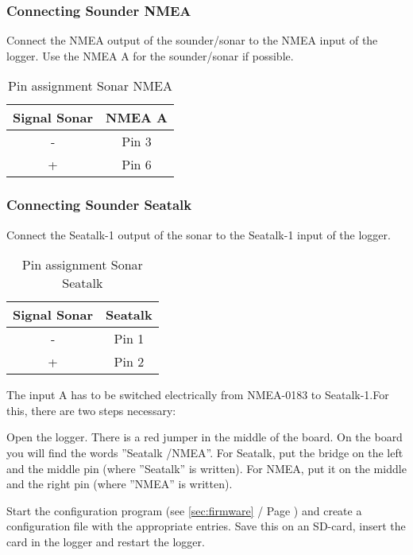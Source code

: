 \documentclass[pdftex, 8pt, paper=130mm:92mm,pagesize]{scrartcl}
\begin{document}
\subsubsection{Connecting Sounder NMEA}

Connect the NMEA output of the sounder/sonar to the NMEA input of the logger. Use the NMEA A for the sounder/sonar if possible. 

\begin{table}[H]
\centering
{}
\begin{tabular}{cc} \toprule
Signal Sonar & NMEA A\\ \midrule
- & Pin 3\\
+ & Pin 6\\ \bottomrule
\end{tabular}	
\caption{Pin assignment Sonar NMEA}
\end{table}

\subsubsection{Connecting Sounder Seatalk}\label{sec:seatalk}

Connect the Seatalk-1 output of the sonar to the Seatalk-1 input of the logger.

\begin{table}[H]
\centering
{}
\begin{tabular}{cc} \toprule
Signal Sonar & Seatalk\\ \midrule
- & Pin 1\\
+ & Pin 2\\ \bottomrule
\end{tabular}	
\caption{Pin assignment Sonar Seatalk}
\end{table}
\newpage
The input A has to be switched electrically from NMEA-0183 to Seatalk-1.\newline For this, there are two steps necessary:

\begin{compactenum}
 \item Open the logger. There is a red jumper in the middle of the board. On the board you will find the words ''Seatalk /NMEA''. For Seatalk, put the bridge on the left and the middle pin (where ''Seatalk'' is written). For NMEA, put it on the middle and the right pin (where ''NMEA'' is written). 

\item Start the configuration program (see \ref{sec:firmware}  / Page \pageref{sec:firmware}) and create a configuration file with the appropriate entries. Save this on an SD-card, insert the card in the logger and restart the logger. 
\end{compactenum}
\end{document}
